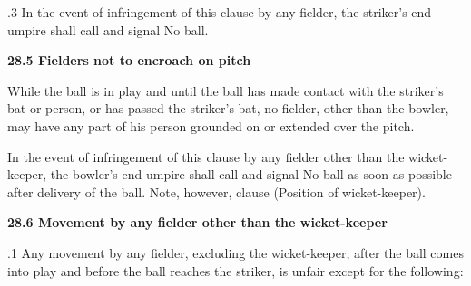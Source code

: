 \documentclass[12pt]{article}
\begin{document}
\vspace{\baselineskip}
\begin{adjustwidth}{0.5in}{0.26in}
{\fontsize{9pt}{10.8pt}.3 \tabto{0.49in} In the event of infringement of this clause by any fielder, the striker’s end umpire shall call and signal No ball.\par}\par

\end{adjustwidth}


\vspace{\baselineskip}
{\fontsize{11pt}{13.2pt}\selectfont \textbf{28.5 \tabto{0.47in} Fielders not to encroach on pitch}\par}\par


\vspace{\baselineskip}
\begin{adjustwidth}{0.0in}{0.03in}
{\fontsize{9pt}{10.8pt}\selectfont While the ball is in play and until the ball has made contact with the striker’s bat or person, or has passed the striker’s bat, no fielder, other than the bowler, may have any part of his person grounded on or extended over the pitch.\par}\par

\end{adjustwidth}


\vspace{\baselineskip}
\begin{adjustwidth}{0.0in}{0.14in}
\begin{justify}
{\fontsize{9pt}{10.8pt}\selectfont In the event of infringement of this clause by any fielder other than the wicket-keeper, the bowler’s end umpire shall call and signal No ball as soon as possible after delivery of the ball. Note, however, clause (Position of wicket-keeper).\par}
\end{justify}\par

\end{adjustwidth}


\vspace{\baselineskip}
{\fontsize{11pt}{13.2pt}\selectfont \textbf{28.6 \tabto{0.47in} Movement by any fielder other than the wicket-keeper}\par}\par


\vspace{\baselineskip}
\begin{adjustwidth}{0.5in}{0.04in}
{\fontsize{9pt}{10.8pt}.1 \tabto{0.49in} Any movement by any fielder, excluding the wicket-keeper, after the ball comes into play and before the ball reaches the striker, is unfair except for the following:\par}\par

\end{adjustwidth}
\end{document}
